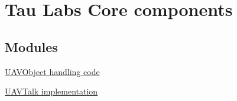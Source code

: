 \hypertarget{group___tau_labs_core}{\section{\-Tau \-Labs \-Core components}
\label{group___tau_labs_core}
}
\subsection*{\-Modules}
\begin{DoxyCompactItemize}
\item 
\hyperlink{group___u_a_v_object_handling}{\-U\-A\-V\-Object handling code}
\item 
\hyperlink{group___u_a_v_talk}{\-U\-A\-V\-Talk implementation}
\end{DoxyCompactItemize}
